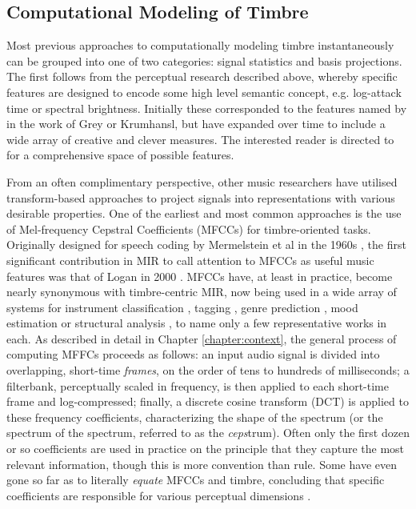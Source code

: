 \subsection{Computational Modeling of Timbre}
Most previous approaches to computationally modeling timbre instantaneously can be grouped into one of two categories: signal statistics and basis projections.
The first follows from the perceptual research described above, whereby specific features are designed to encode some high level semantic concept, e.g. log-attack time or spectral brightness.
Initially these corresponded to the features named by in the work of Grey or Krumhansl, but have expanded over time to include a wide array of creative and clever measures.
The interested reader is directed to \cite{Essid2006} for a comprehensive space of possible features.

From an often complimentary perspective, other music researchers have utilised transform-based approaches to project signals into representations with various desirable properties.
One of the earliest and most common approaches is the use of Mel-frequency Cepstral Coefficients (MFCCs) for timbre-oriented tasks.
Originally designed for speech coding by Mermelstein et al in the 1960s \cite{Mermelstein}, the first significant contribution in MIR to call attention to MFCCs as useful music features was that of Logan in 2000 \cite{Logan}.
MFCCs have, at least in practice, become nearly synonymous with timbre-centric MIR, now being used in a wide array of systems for instrument classification \cite{anyone}, tagging \cite{anyone_else}, genre prediction \cite{jesus}, mood estimation \cite{schmidt} or structural analysis \cite{levy}, to name only a few representative works in each.
As described in detail in Chapter \ref{chapter:context}, the general process of computing MFFCs proceeds as follows: an input audio signal is divided into overlapping, short-time \emph{frames}, on the order of tens to hundreds of milliseconds; a filterbank, perceptually scaled in frequency, is then applied to each short-time frame and log-compressed; finally, a discrete cosine transform (DCT) is applied to these frequency coefficients, characterizing the shape of the spectrum (or the spectrum of the spectrum, referred to as the \emph{ceps}trum).
Often only the first dozen or so coefficients are used in practice on the principle that they capture the most relevant information, though this is more convention than rule.
Some have even gone so far as to literally \emph{equate} MFCCs and timbre, concluding that specific coefficients are responsible for various perceptual dimensions \cite{Teresawa2007}.

